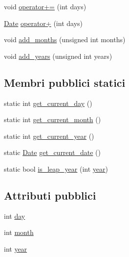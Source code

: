 \begin{DoxyCompactItemize}
\item 
void \mbox{\hyperlink{structmm_1_1util_1_1_date_a9aecce8821f2448c0d2d36a5fbf455b1}{operator+=}} (int days)
\item 
\mbox{\hyperlink{structmm_1_1util_1_1_date}{Date}} \mbox{\hyperlink{structmm_1_1util_1_1_date_a36a932c021e6e5e9ebed44752b78fd7c}{operator+}} (int days)
\item 
void \mbox{\hyperlink{structmm_1_1util_1_1_date_ae875de5d40ab9dfa1f1e22cb8a847b60}{add\+\_\+months}} (unsigned int months)
\item 
void \mbox{\hyperlink{structmm_1_1util_1_1_date_a5ca08a73148a58f47847a30040eee70b}{add\+\_\+years}} (unsigned int years)
\end{DoxyCompactItemize}
\subsection*{Membri pubblici statici}
\begin{DoxyCompactItemize}
\item 
static int \mbox{\hyperlink{structmm_1_1util_1_1_date_ad5ed2bc80bbaa949aa13707a73064345}{get\+\_\+current\+\_\+day}} ()
\item 
static int \mbox{\hyperlink{structmm_1_1util_1_1_date_ab3da347f3603aa3a7fe057a5a0d012d2}{get\+\_\+current\+\_\+month}} ()
\item 
static int \mbox{\hyperlink{structmm_1_1util_1_1_date_afec17843da4296a2341290107901eaa5}{get\+\_\+current\+\_\+year}} ()
\item 
static \mbox{\hyperlink{structmm_1_1util_1_1_date}{Date}} \mbox{\hyperlink{structmm_1_1util_1_1_date_af0758fad7ef32fd535db3295136466eb}{get\+\_\+current\+\_\+date}} ()
\item 
static bool \mbox{\hyperlink{structmm_1_1util_1_1_date_a89c7d3f4d8af79878a28815ffbe2e536}{is\+\_\+leap\+\_\+year}} (int \mbox{\hyperlink{structmm_1_1util_1_1_date_a318909ff98468f29c7912fa9cffea079}{year}})
\end{DoxyCompactItemize}
\subsection*{Attributi pubblici}
\begin{DoxyCompactItemize}
\item 
int \mbox{\hyperlink{structmm_1_1util_1_1_date_a6a697c80be4f09cdb4ee400721314d87}{day}}
\item 
int \mbox{\hyperlink{structmm_1_1util_1_1_date_a018f3e7261b88c9a47aae5b08120b331}{month}}
\item 
int \mbox{\hyperlink{structmm_1_1util_1_1_date_a318909ff98468f29c7912fa9cffea079}{year}}
\end{DoxyCompactItemize}
